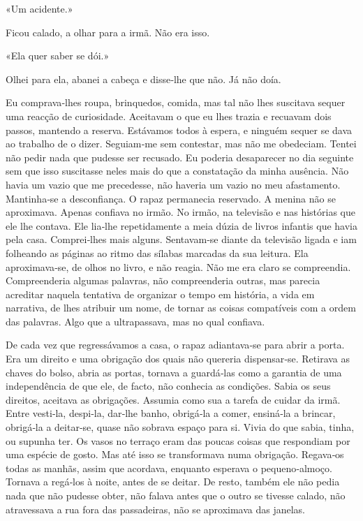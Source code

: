 «Um acidente.»

Ficou calado, a olhar para a irmã. Não era isso.

«Ela quer saber se dói.»

Olhei para ela, abanei a cabeça e disse­‑lhe que não. Já não doía.

Eu comprava­‑lhes roupa, brinquedos, comida, mas tal não lhes suscitava
sequer uma reacção de curiosidade. Aceitavam o que eu lhes trazia e
recuavam dois passos, mantendo a reserva. Estávamos todos à espera, e
ninguém sequer se dava ao trabalho de o dizer. Seguiam­‑me sem
contestar, mas não me obedeciam. Tentei não pedir nada que pudesse ser
recusado. Eu poderia desaparecer no dia seguinte sem que isso suscitasse
neles mais do que a constatação da minha ausência. Não havia um vazio
que me precedesse, não haveria um vazio no meu afastamento. Mantinha­‑se
a desconfiança. O rapaz permanecia reservado. A menina não se
aproximava. Apenas confiava no irmão. No irmão, na televisão e nas
histórias que ele lhe contava. Ele lia­‑lhe repetidamente a meia dúzia
de livros infantis que havia pela casa. Comprei­‑lhes mais alguns.
Sentavam­‑se diante da televisão ligada e iam folheando as páginas ao
ritmo das sílabas marcadas da sua leitura. Ela aproximava­‑se, de olhos
no livro, e não reagia. Não me era claro se compreendia. Compreenderia
algumas palavras, não compreenderia outras, mas parecia acreditar
naquela tentativa de organizar o tempo em história, a vida em narrativa,
de lhes atribuir um nome, de tornar as coisas compatíveis com a ordem
das palavras. Algo que a ultrapassava, mas no qual confiava.

De cada vez que regressávamos a casa, o rapaz adiantava­‑se para abrir a
porta. Era um direito e uma obrigação dos quais não quereria
dispensar­‑se. Retirava as chaves do bolso, abria as portas, tornava a
guardá­‑las como a garantia de uma independência de que ele, de facto,
não conhecia as condições. Sabia os seus direitos, aceitava as
obrigações. Assumia como sua a tarefa de cuidar da irmã. Entre
vesti­‑la, despi­‑la, dar­‑lhe banho, obrigá­‑la a comer, ensiná­‑la a
brincar, obrigá­‑la a deitar­‑se, quase não sobrava espaço para si.
Vivia do que sabia, tinha, ou supunha ter. Os vasos no terraço eram das
poucas coisas que respondiam por uma espécie de gosto. Mas até isso se
transformava numa obrigação. Regava­‑os todas as manhãs, assim que
acordava, enquanto esperava o pequeno­‑almoço. Tornava a regá­‑los à
noite, antes de se deitar. De resto, também ele não pedia nada que não
pudesse obter, não falava antes que o outro se tivesse calado, não
atravessava a rua fora das passadeiras, não se aproximava das janelas.

